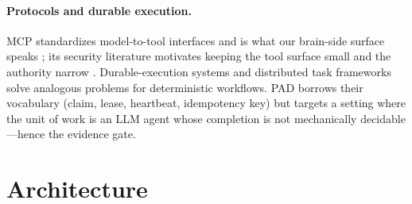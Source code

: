 \documentclass{article}
\begin{document}
\paragraph{Protocols and durable execution.} MCP standardizes model-to-tool
interfaces and is what our brain-side surface speaks \cite{mcpspec2025}; its
security literature motivates keeping the tool surface small and the authority
narrow \cite{etdi2025}. Durable-execution systems \cite{temporal} and distributed
task frameworks \cite{ray2018} solve analogous problems for deterministic
workflows. PAD borrows their vocabulary (claim, lease, heartbeat, idempotency key)
but targets a setting where the unit of work is an LLM agent whose completion is not
mechanically decidable---hence the evidence gate.

\section{Architecture}
\label{sec:arch}
\end{document}
